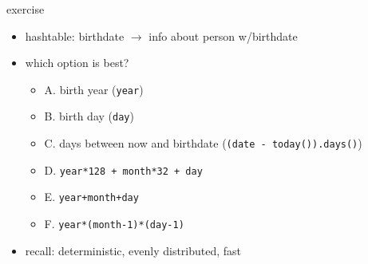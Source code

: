 \begin{frame}[fragile,label=exercise]{exercise}
    \lstset{language=C++}
    \begin{itemize}
    \item hashtable: birthdate $\rightarrow$ info about person w/birthdate
    \item which option is best?
    \begin{itemize}
    \item A. birth year (\lstinline|year|)
    \item B. birth day (\lstinline|day|)
    \item C. days between now and birthdate (\lstinline|(date - today()).days()|)
    \item D. \lstinline|year*128 + month*32 + day|
    \item E. \lstinline|year+month+day|
    \item F. \lstinline|year*(month-1)*(day-1)|
    \end{itemize}
    \item recall: deterministic, evenly distributed, fast
    \end{itemize}
\end{frame}
